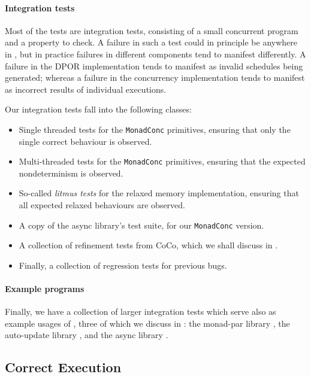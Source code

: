 \paragraph{Integration tests}
Most of the tests are integration tests, consisting of a small
concurrent program and a property to check.  A failure in such a test
could in principle be anywhere in \dejafu{}, but in practice failures
in different components tend to manifest differently.  A failure in
the DPOR implementation tends to manifest as invalid schedules being
generated; whereas a failure in the concurrency implementation tends
to manifest as incorrect results of individual executions.

Our integration tests fall into the following classes:

\begin{itemize}
\item Single threaded tests for the \verb|MonadConc| primitives,
  ensuring that only the single correct behaviour is observed.
\item Multi-threaded tests for the \verb|MonadConc| primitives,
  ensuring that the expected nondeterminism is observed.
\item So-called \emph{litmus tests} for the relaxed memory
  implementation, ensuring that all expected relaxed behaviours are
  observed.
\item A copy of the async library's \parencite{async} test suite, for our
  \verb|MonadConc| version.
\item A collection of refinement tests from CoCo, which we shall
  discuss in .
\item Finally, a collection of regression tests for previous bugs.
\end{itemize}

\paragraph{Example programs}
Finally, we have a collection of larger integration tests which serve
also as example usages of \dejafu{}, three of which we discuss in
: the monad-par library
\parencite{monad_par,marlow2011}, the auto-update library
\parencite{auto_update}, and the async library \parencite{async}.

\subsection{Correct Execution}

